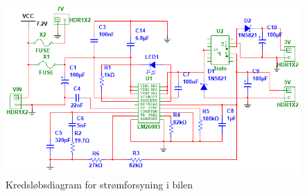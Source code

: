 \begin{landscape}
\begin{figure}[h]
\centering
\includegraphics[height=\textwidth-3.5 cm]{../fig/diagrammer/bil/psu_kredsloeb}
\caption{Kredsløbsdiagram for strømforsyning i bilen}
\label{fig:bil_psu}
\end{figure}
\end{landscape}